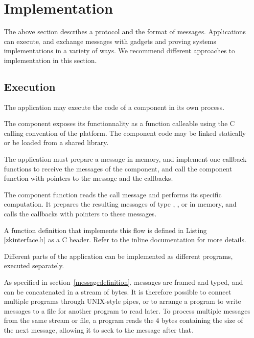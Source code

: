 \section{Implementation}
\label{sec:implementation}

The above section describes a protocol and the format of messages.
Applications can execute, and exchange messages with
gadgets and proving systems implementations in a variety of ways.
We recommend different approaches to implementation in this section.


\subsection{Execution}

\label{inmemory}
The application may execute the code of a component in its own process.

The component exposes its functionnality as a function calleable using the C calling convention of the platform. The component code may be linked statically or be loaded from a shared library.

The application must prepare a  message in memory, and implement one callback functions to receive the messages of the component,
and call the component function with pointers to the message and the callbacks.

The component function reads the call message and performs its specific computation. It prepares the resulting messages of type
, , or 
in memory, and calls the callbacks with pointers to these messages.

A function definition that implements this flow is defined in Listing \ref{zkinterface.h} as a C header. Refer to the inline documentation for more details.



Different parts of the application can be implemented as different
programs, executed separately.

As specified in section~\ref{messagedefinition}, messages are framed and typed,
and can be concatenated in a stream of bytes. It is therefore possible to connect multiple programs through UNIX-style pipes, or to arrange a program to write messages to a file for another program to read later.
To process multiple messages from the same stream or file, a program
reads the 4 bytes containing the size of the next message, allowing it to seek
to the message after that.

